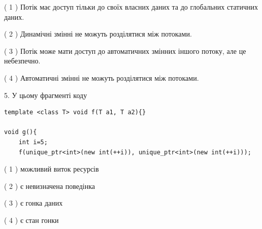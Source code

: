 \documentclass[12pt, ukrainian]{article}
\begin{document}
\begin {large}
{( 1 ) Потік має доступ тільки до своїх власних даних та до глобальних статичних даних.%

( 2 ) Динамічні змінні не можуть розділятися між потоками.%

( 3 ) Потік може мати доступ до автоматичних змінних іншого потоку, але це небезпечно.%

( 4 ) Автоматичні змінні не можуть розділятися між потоками.%


5. У цьому фрагменті коду
\begin{verbatim}
template <class T> void f(T a1, T a2){}

void g(){
    int i=5;
    f(unique_ptr<int>(new int(++i)), unique_ptr<int>(new int(++i)));
\end{verbatim}

( 1 ) можливий виток ресурсів%

( 2 ) є невизначена поведінка%

( 3 ) є гонка даних%

( 4 ) є стан гонки%
}
\end {large}
\end{document}
